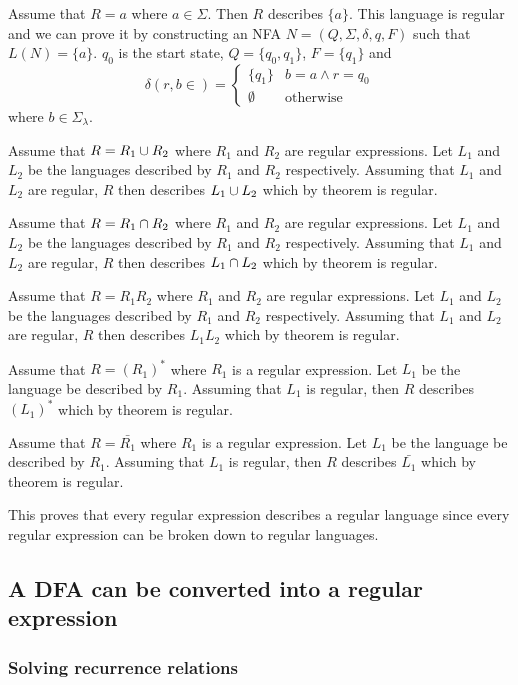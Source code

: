 \documentclass{article}
\newcommand{\emptyString}{\lambda}
\begin{document}
Assume that \(R=a\) where \(a\in\Sigma\). Then \(R\) describes \(\{a\}\).
This language is regular and we can prove it by constructing an NFA \(N=(Q, \Sigma, \delta, q, F)\)
such that \(L(N)=\{a\}\).
\(q_0\) is the start state, \(Q=\{q_0, q_1\}\), \(F=\{q_1\}\) and
\[
    \delta(r,b \in) =
    \begin{cases}
        \{q_1\} & b=a \land r=q_0\\
        \emptyset & \text{otherwise}
    \end{cases}
\]
where \(b\in\Sigma_\emptyString\).
\wrapfill

Assume that \(R=R_1 \cup R_2\) where \(R_1\) and \(R_2\) are regular expressions.
Let \(L_1\) and \(L_2\) be the languages described by \(R_1\) and \(R_2\) respectively.
Assuming that \(L_1\) and \(L_2\) are regular, \(R\) then describes \(L_1 \cup L_2\) which by theorem is regular.

Assume that \(R=R_1 \cap R_2\) where \(R_1\) and \(R_2\) are regular expressions.
Let \(L_1\) and \(L_2\) be the languages described by \(R_1\) and \(R_2\) respectively.
Assuming that \(L_1\) and \(L_2\) are regular, \(R\) then describes \(L_1 \cap L_2\) which by theorem is regular.

Assume that \(R=R_1 R_2\) where \(R_1\) and \(R_2\) are regular expressions.
Let \(L_1\) and \(L_2\) be the languages described by \(R_1\) and \(R_2\) respectively.
Assuming that \(L_1\) and \(L_2\) are regular, \(R\) then describes \(L_1 L_2\) which by theorem is regular.

Assume that \(R={(R_1)}^*\) where \(R_1\) is a regular expression. Let \(L_1\) be the language be described
by \(R_1\). Assuming that \(L_1\) is regular, then \(R\) describes \({(L_1)}^*\) which by theorem is regular.

Assume that \(R=\bar{R_1}\) where \(R_1\) is a regular expression. Let \(L_1\) be the language be described
by \(R_1\). Assuming that \(L_1\) is regular, then \(R\) describes \(\bar{L_1}\) which by theorem is regular.

This proves that every regular expression describes a regular language since every
regular expression can be broken down to regular languages.

\subsection{A DFA can be converted into a regular expression}

\subsubsection{Solving recurrence relations}
\end{document}
